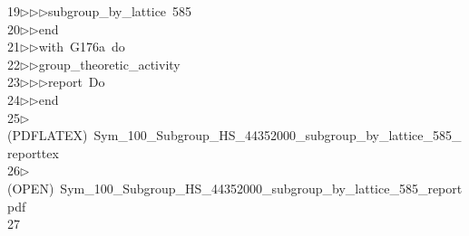 \begin{tabbing}
19\>$\triangleright$\>$\triangleright$\>$\triangleright$\>subgroup\_by\_lattice\ 585\ \\[0pt]
20\>$\triangleright$\>$\triangleright$\>end\ \\[0pt]
21\>$\triangleright$\>$\triangleright$\>with\ G176a\ do\ \\[0pt]
22\>$\triangleright$\>$\triangleright$\>group\_theoretic\_activity\ \\[0pt]
23\>$\triangleright$\>$\triangleright$\>$\triangleright$\>report\ Do\ \\[0pt]
24\>$\triangleright$\>$\triangleright$\>end\\[0pt]
25\>$\triangleright$\>(PDFLATEX)\ Sym\_100\_Subgroup\_HS\_44352000\_subgroup\_by\_lattice\_585\_reporttex\\[0pt]
26\>$\triangleright$\>(OPEN)\ Sym\_100\_Subgroup\_HS\_44352000\_subgroup\_by\_lattice\_585\_reportpdf\\[0pt]
27\>\end{tabbing}
